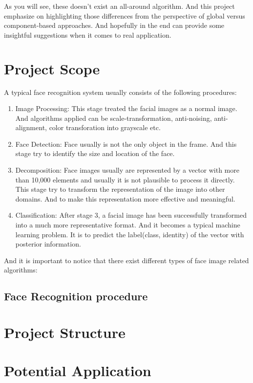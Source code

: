 As you will see, these doesn't exist an all-around algorithm. And this project emphasize on highlighting those differences from the perspective of global versus component-based approaches. And hopefully in the end can provide some insightful suggestions when it comes to real application.

\section{Project Scope}
A typical face recognition system usually consists of the following procedures:
\begin{enumerate}
	\item{Image Processing: } This stage treated the facial images as a normal image. And algorithms applied can be scale-transformation, anti-noising, anti-alignment, color transforation into grayscale etc.
	\item{Face Detection: } Face usually is not the only object in the frame. And this stage try to identify the size and location of the face.
	\item{Decomposition: } Face images usually are represented by a vector with more than 10,000 elements and usually it is not plausible to process it directly. This stage try to transform the representation of the image into other domains. And to make this representation more effective and meaningful.
	\item{Classification: } After stage 3, a facial image has been successfully transformed into a much more representative format. And it becomes a typical machine learning problem. It is to predict the label(class, identity) of the vector with posterior information.
\end{enumerate}
And it is important to notice that there exist different types of face image related algorithms:
\begin{enumerate}
	\item{
\end{enumerate}

\subsection{Face Recognition procedure}

\section{Project Structure}

\section{Potential Application}
